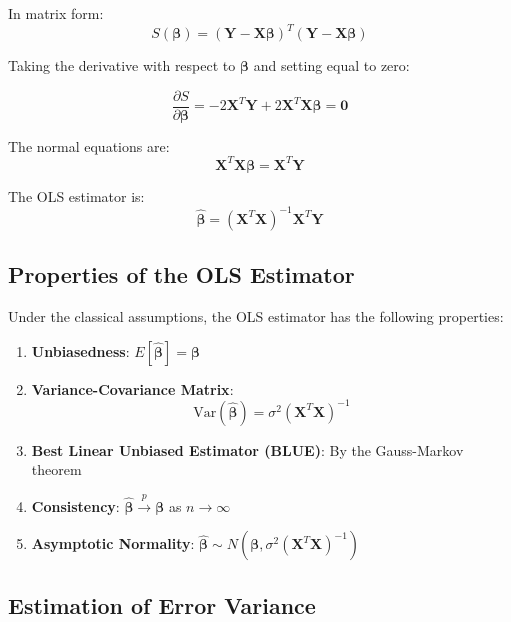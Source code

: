 \documentclass[twoside]{book}
\begin{document}
In matrix form:
\begin{equation}
S(\boldsymbol{\beta}) = (\mathbf{Y} - \mathbf{X}\boldsymbol{\beta})^T(\mathbf{Y} - \mathbf{X}\boldsymbol{\beta})
\end{equation}

Taking the derivative with respect to $\boldsymbol{\beta}$ and setting equal to zero:

\begin{equation}
\frac{\partial S}{\partial \boldsymbol{\beta}} = -2\mathbf{X}^T\mathbf{Y} + 2\mathbf{X}^T\mathbf{X}\boldsymbol{\beta} = \mathbf{0}
\end{equation}

The normal equations are:
\begin{equation}
\mathbf{X}^T\mathbf{X}\boldsymbol{\beta} = \mathbf{X}^T\mathbf{Y}
\end{equation}

The OLS estimator is:
\begin{equation}
\hat{\boldsymbol{\beta}} = (\mathbf{X}^T\mathbf{X})^{-1}\mathbf{X}^T\mathbf{Y}
\end{equation}

\subsection{Properties of the OLS Estimator}

Under the classical assumptions, the OLS estimator has the following properties:

\begin{enumerate}
    \item \textbf{Unbiasedness}: $E[\hat{\boldsymbol{\beta}}] = \boldsymbol{\beta}$
    \item \textbf{Variance-Covariance Matrix}:
    \begin{equation}
    \text{Var}(\hat{\boldsymbol{\beta}}) = \sigma^2(\mathbf{X}^T\mathbf{X})^{-1}
    \end{equation}
    \item \textbf{Best Linear Unbiased Estimator (BLUE)}: By the Gauss-Markov theorem
    \item \textbf{Consistency}: $\hat{\boldsymbol{\beta}} \xrightarrow{p} \boldsymbol{\beta}$ as $n \to \infty$
    \item \textbf{Asymptotic Normality}: $\hat{\boldsymbol{\beta}} \sim N(\boldsymbol{\beta}, \sigma^2(\mathbf{X}^T\mathbf{X})^{-1})$
\end{enumerate}

\subsection{Estimation of Error Variance}
\end{document}

